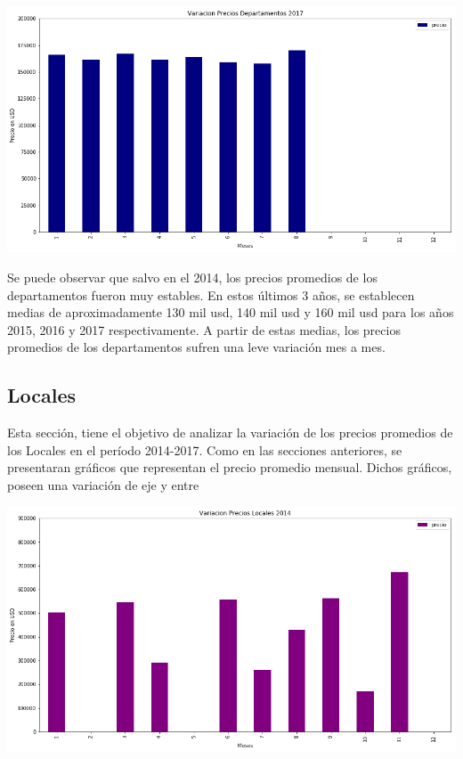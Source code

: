 \documentclass[a4paper, 10pt]{article}
\begin{document}
			\begin{center}
   		    		\includegraphics[width=\textwidth]{images/vDepto2017}
			\end{center}

			Se puede observar que salvo en el 2014, los precios promedios de los departamentos fueron muy estables. En estos últimos 3 años, se establecen medias de aproximadamente 130 mil usd, 140 mil usd y 160 mil usd para los años 2015, 2016 y 2017 respectivamente. A partir de estas medias, los precios promedios de los departamentos sufren una leve variación mes a mes.

			\subsection{Locales}

			Esta sección, tiene el objetivo de analizar la variación de los precios promedios de los Locales en el período 2014-2017. Como en las secciones anteriores, se presentaran gráficos que representan el precio promedio mensual. Dichos gráficos, poseen una variación de eje y entre

			\begin{center}
   		    		\includegraphics[width=\textwidth]{images/vLoc2014}
			\end{center}
\end{document}
